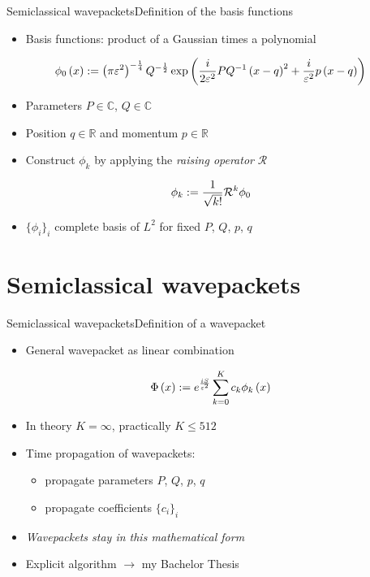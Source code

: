 \documentclass{beamer}
\begin{document}
\begin{frame}{Semiclassical wavepackets}{Definition of the basis functions}
  \begin{itemize}
    \item Basis functions: product of a Gaussian times a polynomial
  \end{itemize}
  \begin{equation*} \label{eq:hagedorn_groundstate_1d}
  \phi_0 \left( x \right) :=
  \left(\pi\varepsilon^2\right)^{-\frac{1}{4}} Q^{-\frac{1}{2}}
  \exp \left(
      \frac{i}{2\varepsilon^2} PQ^{-1}\left(x-q\right)^2
      + \frac{i}{\varepsilon^2} p\left(x-q\right)
  \right)
  \end{equation*}
  \begin{itemize}
    \item Parameters $P \in \mathbb{C}$, $Q \in \mathbb{C}$
    \item Position $q \in \mathbb{R}$ and momentum $p \in \mathbb{R}$
    \item Construct $\phi_k$ by applying the \emph{raising operator} $\mathcal{R}$
  \end{itemize}
  \begin{equation*}
    \phi_k := \frac{1}{\sqrt{k!}} \mathcal{R}^k \phi_0
  \end{equation*}
  \begin{itemize}
    \item $\{\phi_i\}_i$ complete basis of $L^2$ for fixed $P$, $Q$, $p$, $q$
  \end{itemize}
\end{frame}


\section{Semiclassical wavepackets}


\begin{frame}{Semiclassical wavepackets}{Definition of a wavepacket}
  \begin{itemize}
    \item General wavepacket as linear combination
  \end{itemize}
  \begin{equation*} \label{eq:hawp_def_single}
    \Phi\left( x \right) := e^{\frac{iS}{\varepsilon^2}} \sum_{k=0}^{K} c_k \phi_k \left( x \right)
  \end{equation*}
  \begin{itemize}
    \item In theory $K = \infty$, practically $K \leq 512$
    \item Time propagation of wavepackets:
    \begin{itemize}
      \item propagate parameters $P$, $Q$, $p$, $q$
      \item propagate coefficients $\{c_i\}_i$
    \end{itemize}
    \item \emph{Wavepackets stay in this mathematical form}
    \item Explicit algorithm $\rightarrow$ my Bachelor Thesis
  \end{itemize}
\end{frame}
\end{document}
